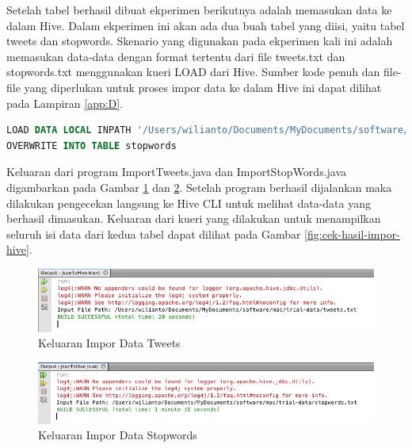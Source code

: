Setelah tabel berhasil dibuat ekperimen berikutnya adalah memasukan data ke dalam Hive. Dalam ekperimen ini akan ada dua buah tabel yang diisi, yaitu tabel tweets dan stopwords. Skenario yang digunakan pada ekperimen kali ini adalah memasukan data-data dengan format tertentu dari file tweets.txt dan stopwords.txt menggunakan kueri LOAD dari Hive. Sumber kode penuh dan file-file yang diperlukan untuk proses impor data ke dalam Hive ini dapat dilihat pada Lampiran \ref{app:D}. 

\begin{lstlisting}[language=sql,basicstyle=\tiny,caption=Kueri Hive untuk Import Data dari File]
LOAD DATA LOCAL INPATH '/Users/wilianto/Documents/MyDocuments/software/mac/trial-data/stopwords.txt'
OVERWRITE INTO TABLE stopwords
\end{lstlisting}

Keluaran dari program ImportTweets.java dan ImportStopWords.java digambarkan pada Gambar \ref{fig:hasil-impor-tweets} dan \ref{fig:hasil-impor-stopwords}. Setelah program berhasil dijalankan maka dilakukan pengecekan langsung ke Hive CLI untuk melihat data-data yang berhasil dimasukan. Keluaran dari kueri yang dilakukan untuk menampilkan seluruh isi data dari kedua tabel dapat dilihat pada Gambar \ref{fig:cek-hasil-impor-hive}.

\begin{figure}
	\centering
	\includegraphics[scale=0.5]{Gambar/hasil-impor-tweets.png}
	\caption[Keluaran Impor Data Tweets]{Keluaran Impor Data Tweets}
	\label{fig:hasil-impor-tweets}
\end{figure}

\begin{figure}
	\centering
	\includegraphics[scale=0.5]{Gambar/hasil-impor-stopwords.png}
	\caption[Keluaran Impor Data Stopwords]{Keluaran Impor Data Stopwords}
	\label{fig:hasil-impor-stopwords}
\end{figure}

